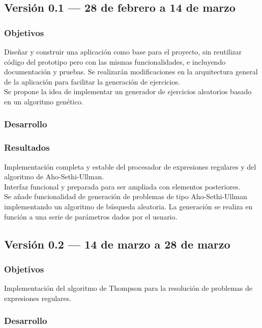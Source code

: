 \subsection{Versión 0.1 --- 28 de febrero a 14 de marzo}

\subsubsection{Objetivos}
Diseñar y construir una aplicación como base para el proyecto, sin reutilizar código del prototipo pero con las mismas funcionalidades, e incluyendo documentación y pruebas.
Se realizarán modificaciones en la arquitectura general de la aplicación para facilitar la generación de ejercicios.
\\
Se propone la idea de implementar un generador de ejercicios aleatorios basado en un algoritmo genético.

\subsubsection{Desarrollo}

\subsubsection{Resultados}
Implementación completa y estable del procesador de expresiones regulares y del algoritmo de Aho-Sethi-Ullman.
\\
Interfaz funcional y preparada para ser ampliada con elementos posteriores.
\\
Se añade funcionalidad de generación de problemas de tipo Aho-Sethi-Ullman implementando un algoritmo de búsqueda aleatoria.
La generación se realiza en función a una serie de parámetros dados por el usuario.

\subsection{Versión 0.2 --- 14 de marzo a 28 de marzo}

\subsubsection{Objetivos}
Implementación del algoritmo de Thompson para la resolución de problemas de expresiones regulares.

\subsubsection{Desarrollo}

